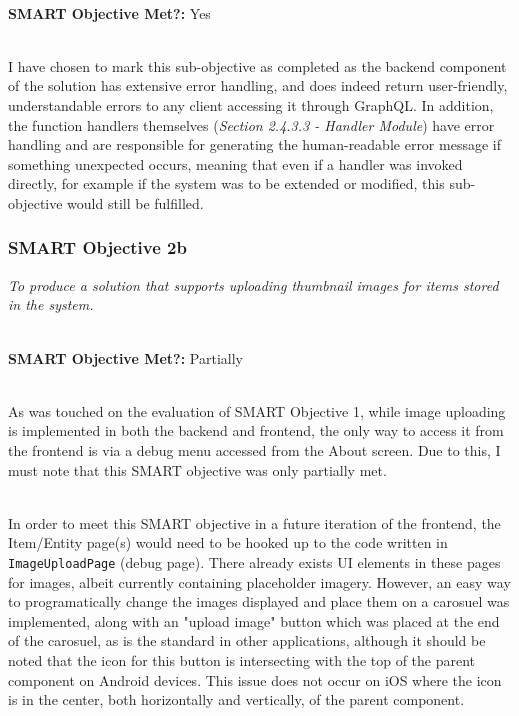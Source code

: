 \documentclass[../main.tex]{subfiles}
\begin{document}
\noindent \\ \textbf{SMART Objective Met?:} Yes

\noindent \\ I have chosen to mark this sub-objective as completed as the backend
component of the solution has extensive error handling, and does indeed return
user-friendly, understandable errors to any client accessing it through GraphQL.
In addition, the function handlers themselves (\textit{Section 2.4.3.3 - Handler Module})
have error handling and are responsible for generating the human-readable error message
if something unexpected occurs, meaning that even if a handler was invoked directly,
for example if the system was to be extended or modified, this sub-objective would still be fulfilled.

\subsubsection{SMART Objective 2b}

\textit{To produce a solution that supports uploading thumbnail images for items
    stored in the system.}

\noindent \\ \textbf{SMART Objective Met?:} Partially

\noindent \\ As was touched on the evaluation of SMART Objective 1, while image uploading
is implemented in both the backend and frontend, the only way to access it from the frontend
is via a debug menu accessed from the About screen. Due to this, I must note that this SMART
objective was only partially met.

\noindent \\ In order to meet this SMART objective in a future iteration of the frontend,
the Item/Entity page(s) would need to be hooked up to the code written in \lstinline{ImageUploadPage}
(debug page). There already exists UI elements in these pages for images, albeit currently
containing placeholder imagery. However, an easy way to programatically change the images
displayed and place them on a carosuel was implemented, along with an "upload image" button
which was placed at the end of the carosuel, as is the standard in other applications, although
it should be noted that the icon for this button is intersecting with the top of the parent
component on Android devices. This issue does not occur on iOS where the icon is in the center,
both horizontally and vertically, of the parent component.
\end{document}

